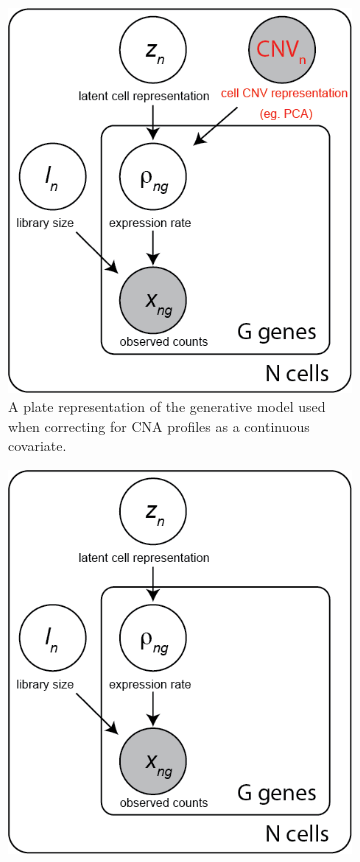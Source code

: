\documentclass{article}
\begin{document}
\begin{figure}[h]
     \centering
     \begin{subfigure}[b]{0.3\textwidth}
         \centering
         \includegraphics[width=\textwidth]{figures/scvi_cnv.png}
         \caption{A plate representation of the generative model used when correcting for CNA profiles as a continuous covariate.}
         \label{fig:scvi_cnv}
     \end{subfigure}
     \hfill
     \begin{subfigure}[b]{0.3\textwidth}
         \centering
         \includegraphics[width=\textwidth]{figures/vanilla_scvi.png}

\end{subfigure}
\end{figure}
\end{document}
